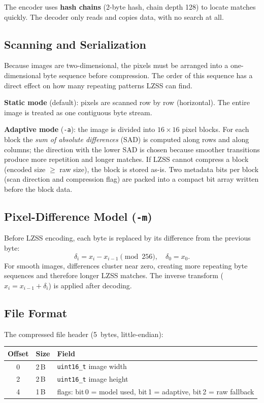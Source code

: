 \documentclass[a4paper,11pt]{article}
\begin{document}
The encoder uses \textbf{hash chains} (2-byte hash, chain depth 128) to
locate matches quickly.  The decoder only reads and copies data, with no
search at all.

\subsection*{Scanning and Serialization}

Because images are two-dimensional, the pixels must be arranged into a
one-dimensional byte sequence before compression.  The order of this
sequence has a direct effect on how many repeating patterns LZSS can find.

\textbf{Static mode} (default): pixels are scanned row by row (horizontal).
The entire image is treated as one contiguous byte stream.

\textbf{Adaptive mode} (\texttt{-a}): the image is divided into
$16\!\times\!16$ pixel blocks.  For each block the \emph{sum of absolute
differences} (SAD) is computed along rows and along columns; the direction
with the lower SAD is chosen because smoother transitions produce more
repetition and longer matches.  If LZSS cannot compress a block (encoded
size $\geq$ raw size), the block is stored as-is.  Two metadata bits per
block (scan direction and compression flag) are packed into a compact bit
array written before the block data.

\subsection*{Pixel-Difference Model (\texttt{-m})}

Before LZSS encoding, each byte is replaced by its difference from the
previous byte:
\[
  \delta_i = x_i - x_{i-1} \pmod{256}, \quad \delta_0 = x_0.
\]
For smooth images, differences cluster near zero, creating more repeating
byte sequences and therefore longer LZSS matches.  The inverse transform
($x_i = x_{i-1} + \delta_i$) is applied after decoding.

\subsection*{File Format}

The compressed file header (5~bytes, little-endian):

\begin{center}
\begin{tabular}{cll}
\toprule
Offset & Size & Field \\
\midrule
0 & 2\,B & \texttt{uint16\_t} image width \\
2 & 2\,B & \texttt{uint16\_t} image height \\
4 & 1\,B & flags: bit\,0 = model used, bit\,1 = adaptive, bit\,2 = raw fallback \\
\bottomrule
\end{tabular}
\end{center}
\end{document}
